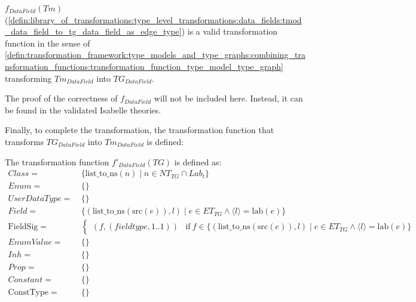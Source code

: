 \begin{thm}
\label{defin:library_of_transformations:type_level_transformations:data_fields:tmod_data_field_to_tg_data_field_as_edge_type_func}
$f_{DataField}(Tm)$ (\cref{defin:library_of_transformations:type_level_transformations:data_fields:tmod_data_field_to_tg_data_field_as_edge_type}) is a valid transformation function in the sense of \cref{defin:transformation_framework:type_models_and_type_graphs:combining_transformation_functions:transformation_function_type_model_type_graph} transforming $Tm_{DataField}$ into $TG_{DataField}$.
\end{thm}

The proof of the correctness of $f_{DataField}$ will not be included here. Instead, it can be found in the validated Isabelle theories.

Finally, to complete the transformation, the transformation function that transforms $TG_{DataField}$ into $Tm_{DataField}$ is defined:

\begin{defin}
\label{defin:library_of_transformations:type_level_transformations:data_fields:tg_data_field_as_edge_type_to_tmod_data_field}
The transformation function $f'_{DataField}(TG)$ is defined as:
\begin{align*}
Class =\ &\{\mathrm{list\_\!to\_\!ns}(n) \mid n \in NT_{TG} \cap Lab_t \} \\
Enum =\ &\{\} \\
UserDataType =\ &\{\} \\
Field =\ &\{(\mathrm{list\_\!to\_\!ns}(\mathrm{src}(e)), l) \mid e \in ET_{TG} \land \langle l \rangle = \mathrm{lab}(e) \} \\
\mathrm{FieldSig} =\ &\begin{cases}
    (f, (fieldtype, 1..1)) &\mathrm{if}\ f \in \{(\mathrm{list\_\!to\_\!ns}(\mathrm{src}(e)), l) \mid e \in ET_{TG} \land \langle l \rangle = \mathrm{lab}(e) \} 
\end{cases} \\
EnumValue =\ &\{\} \\
Inh =\ &\{\} \\
Prop =\ &\{\} \\
Constant =\ &\{\} \\
\mathrm{ConstType} =\ &\{\}
\end{align*}
\end{defin}

